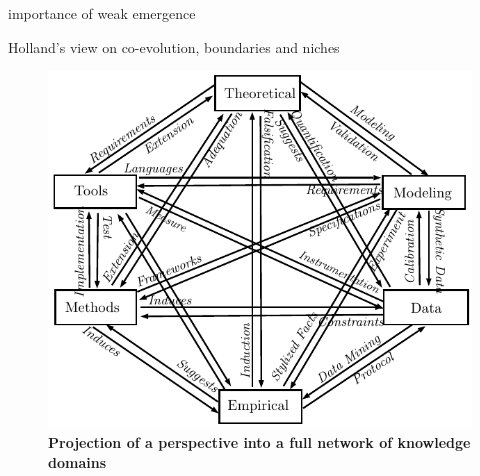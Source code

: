 \documentclass[runningheads,a4paper]{llncs2e/llncs}
\begin{document}



importance of weak emergence \cite{bedau2002downward}

Holland's view on co-evolution, boundaries and niches~\cite{holland2012signals}










\begin{figure}
\centering
\includegraphics[width=\textwidth]{figures/framework}
\caption{\textbf{Projection of a perspective into a full network of knowledge domains}}
\label{fig:fwk}
\end{figure}
\end{document}
